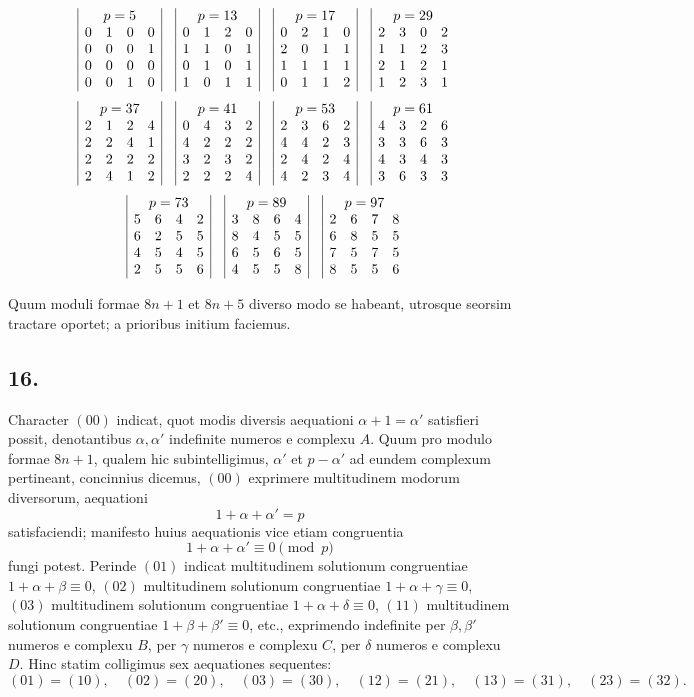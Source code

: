 \documentclass[12pt]{article}
\begin{document}
\[
\begin{array}{c|rrrr|c|rrrr|c|rrrr|c|rrrr}
&\multicolumn{4}{c|}{p=5}&&\multicolumn{4}{c|}{p=13}&&\multicolumn{4}{c|}{p=17}&&\multicolumn{4}{c}{p=29}\\
&0&1&0&0&&0&1&2&0&&0&2&1&0&&2&3&0&2\\
&0&0&0&1&&1&1&0&1&&2&0&1&1&&1&1&2&3\\
&0&0&0&0&&0&1&0&1&&1&1&1&1&&2&1&2&1\\
&0&0&1&0&&1&0&1&1&&0&1&1&2&&1&2&3&1
\end{array}
\]
\[
\begin{array}{c|rrrr|c|rrrr|c|rrrr|c|rrrr}
&\multicolumn{4}{c|}{p=37}&&\multicolumn{4}{c|}{p=41}&&\multicolumn{4}{c|}{p=53}&&\multicolumn{4}{c}{p=61}\\
&2&1&2&4&&0&4&3&2&&2&3&6&2&&4&3&2&6\\
&2&2&4&1&&4&2&2&2&&4&4&2&3&&3&3&6&3\\
&2&2&2&2&&3&2&3&2&&2&4&2&4&&4&3&4&3\\
&2&4&1&2&&2&2&2&4&&4&2&3&4&&3&6&3&3
\end{array}
\]
\[
\begin{array}{c|rrrr|c|rrrr|c|rrrr}
&\multicolumn{4}{c|}{p=73}&&\multicolumn{4}{c|}{p=89}&&\multicolumn{4}{c}{p=97}\\
&5&6&4&2&&3&8&6&4&&2&6&7&8\\
&6&2&5&5&&8&4&5&5&&6&8&5&5\\
&4&5&4&5&&6&5&6&5&&7&5&7&5\\
&2&5&5&6&&4&5&5&8&&8&5&5&6
\end{array}
\]

Quum moduli formae $8n+1$ et $8n+5$ diverso modo se habeant, utrosque seorsim tractare oportet; a prioribus initium faciemus.

\subsection*{16.}

Character $(00)$ indicat, quot modis diversis aequationi $\alpha+1=\alpha'$ satisfieri possit, denotantibus $\alpha,\alpha'$ indefinite numeros e complexu $A$. Quum pro modulo formae $8n+1$, qualem hic subintelligimus, $\alpha'$ et $p-\alpha'$ ad eundem complexum pertineant, concinnius dicemus, $(00)$ exprimere multitudinem modorum diversorum, aequationi
\[
1+\alpha+\alpha'=p
\]
satisfaciendi; manifesto huius aequationis vice etiam congruentia
\[
1+\alpha+\alpha'\equiv0\pmod p
\]
fungi potest. Perinde $(01)$ indicat multitudinem solutionum congruentiae $1+\alpha+\beta\equiv0$, $(02)$ multitudinem solutionum congruentiae $1+\alpha+\gamma\equiv0$, $(03)$ multitudinem solutionum congruentiae $1+\alpha+\delta\equiv0$, $(11)$ multitudinem solutionum congruentiae $1+\beta+\beta'\equiv0$, etc., exprimendo indefinite per $\beta,\beta'$ numeros e complexu $B$, per $\gamma$ numeros e complexu $C$, per $\delta$ numeros e complexu $D$. Hinc statim colligimus sex aequationes sequentes:
\[
(01)=(10),\quad (02)=(20),\quad (03)=(30),\quad
(12)=(21),\quad (13)=(31),\quad (23)=(32).
\]
\end{document}
